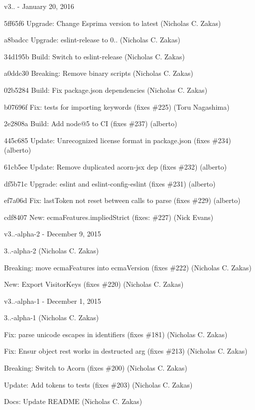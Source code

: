 v3.. -\/ January 20, 2016


\begin{DoxyItemize}
\item 5ff65f6 Upgrade\+: Change Esprima version to latest (Nicholas C. Zakas)
\item a8badcc Upgrade\+: eslint-\/release to 0.. (Nicholas C. Zakas)
\item 34d195b Build\+: Switch to eslint-\/release (Nicholas C. Zakas)
\item a0ddc30 Breaking\+: Remove binary scripts (Nicholas C. Zakas)
\item 02b5284 Build\+: Fix package.\+json dependencies (Nicholas C. Zakas)
\item b07696f Fix\+: tests for importing keywords (fixes \#225) (Toru Nagashima)
\item 2e2808a Build\+: Add node@5 to CI (fixes \#237) (alberto)
\item 445c685 Update\+: Unrecognized license format in package.\+json (fixes \#234) (alberto)
\item 61cb5ee Update\+: Remove duplicated acorn-\/jsx dep (fixes \#232) (alberto)
\item df5b71c Upgrade\+: eslint and eslint-\/config-\/eslint (fixes \#231) (alberto)
\item ef7a06d Fix\+: last\+Token not reset between calls to parse (fixes \#229) (alberto)
\item cdf8407 New\+: ecma\+Features.\+implied\+Strict (fixes\+: \#227) (Nick Evans)
\end{DoxyItemize}

v3..-\/alpha-\/2 -\/ December 9, 2015


\begin{DoxyItemize}
\item 3..-\/alpha-\/2 (Nicholas C. Zakas)
\item Breaking\+: move ecma\+Features into ecma\+Version (fixes \#222) (Nicholas C. Zakas)
\item New\+: Export Visitor\+Keys (fixes \#220) (Nicholas C. Zakas)
\end{DoxyItemize}

v3..-\/alpha-\/1 -\/ December 1, 2015


\begin{DoxyItemize}
\item 3..-\/alpha-\/1 (Nicholas C. Zakas)
\item Fix\+: parse unicode escapes in identifiers (fixes \#181) (Nicholas C. Zakas)
\item Fix\+: Ensur object rest works in destructed arg (fixes \#213) (Nicholas C. Zakas)
\item Breaking\+: Switch to Acorn (fixes \#200) (Nicholas C. Zakas)
\item Update\+: Add tokens to tests (fixes \#203) (Nicholas C. Zakas)
\item Docs\+: Update R\+E\+A\+D\+ME (Nicholas C. Zakas)
\end{DoxyItemize}

